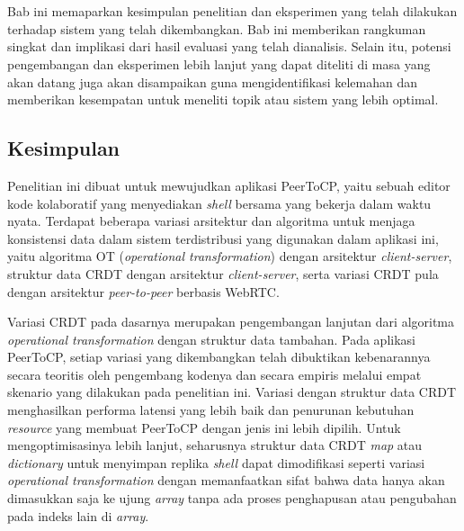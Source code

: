 \chapter{\kesimpulan}
\label{bab:6}
Bab ini memaparkan kesimpulan penelitian dan eksperimen yang telah dilakukan terhadap sistem yang telah dikembangkan. Bab ini memberikan rangkuman singkat dan implikasi dari hasil evaluasi yang telah dianalisis. Selain itu, potensi pengembangan dan eksperimen lebih lanjut yang dapat diteliti di masa yang akan datang juga akan disampaikan guna mengidentifikasi kelemahan dan memberikan kesempatan untuk meneliti topik atau sistem yang lebih optimal.

\section{Kesimpulan}
\label{sec:kesimpulan}

Penelitian ini dibuat untuk mewujudkan aplikasi PeerToCP, yaitu sebuah editor kode kolaboratif yang menyediakan \textit{shell} bersama yang bekerja dalam waktu nyata. Terdapat beberapa variasi arsitektur dan algoritma untuk menjaga konsistensi data dalam sistem terdistribusi yang digunakan dalam aplikasi ini, yaitu algoritma OT (\textit{operational transformation}) dengan arsitektur \textit{client-server}, struktur data CRDT dengan arsitektur \textit{client-server}, serta variasi CRDT pula dengan arsitektur \textit{peer-to-peer} berbasis WebRTC.

Variasi CRDT pada dasarnya merupakan pengembangan lanjutan dari algoritma \textit{operational transformation} dengan struktur data tambahan. Pada aplikasi PeerToCP, setiap variasi yang dikembangkan telah dibuktikan kebenarannya secara teoritis oleh pengembang kodenya dan secara empiris melalui empat skenario yang dilakukan pada penelitian ini. Variasi dengan struktur data CRDT menghasilkan performa latensi yang lebih baik dan penurunan kebutuhan \textit{resource} yang membuat PeerToCP dengan jenis ini lebih dipilih. Untuk mengoptimisasinya lebih lanjut, seharusnya struktur data CRDT \textit{map} atau \textit{dictionary} untuk menyimpan replika \textit{shell} dapat dimodifikasi seperti variasi \textit{operational transformation} dengan memanfaatkan sifat bahwa data hanya akan dimasukkan saja ke ujung \textit{array} tanpa ada proses penghapusan atau pengubahan pada indeks lain di \textit{array}.

